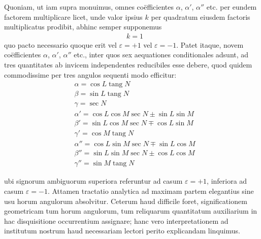 Quoniam, ut iam supra monuimus, omnes coëfficientes $\alpha$, $\alpha'$, $\alpha''$ etc. per
eundem factorem multiplicare licet, unde valor ipsius $k$ per quadratum eiusdem
factoris multiplicatus prodibit, abhinc semper supponemus
\[
\begin{aligned}
&k=1
\end{aligned}
\]
quo pacto necessario quoque erit vel $\varepsilon=+1$ vel $\varepsilon=-1$. Patet itaque, novem coëfficientes $\alpha$, $\alpha'$, $\alpha''$ etc., inter quos sex aequationes conditionales adsunt,
ad tres quantitates ab invicem independentes reducibiles esse debere, quod quidem commodissime per tres angulos sequenti modo efficitur:
\[
\begin{aligned}
&\alpha=\cos L\operatorname{tang}N\\[6pt]
&\beta=\sin L\operatorname{tang}N\\[6pt]
&\gamma=\sec N\\[6pt]
&\alpha'=\cos L\cos M\sec N\pm\sin L\sin M\\[6pt]
&\beta'=\sin L\cos M\sec N\mp\cos L\sin M\\[6pt]
&\gamma'=\cos M\operatorname{tang}N\\[6pt]
&\alpha''=\cos L\sin M\sec N\mp\sin L\cos M\\[6pt]
&\beta''=\sin L\sin M\sec N\pm\cos L\cos M\\[6pt]
&\gamma''=\sin M\operatorname{tang}N
\end{aligned}
\]

\noindent ubi signorum ambiguorum superiora referuntur ad casum $\varepsilon=+1$, inferiora ad
casum $\varepsilon=-1$. Attamen tractatio analytica ad maximam partem elegantius
sine usu horum angulorum absolvitur. Ceterum haud difficile foret, significationem geometricam tum horum angulorum, tum reliquarum quantitatum auxiliarium in hac disquisitione occurrentium assignare; hanc vero interpretationem ad
institutum nostrum haud necessariam lectori perito explicandam linquimus.


